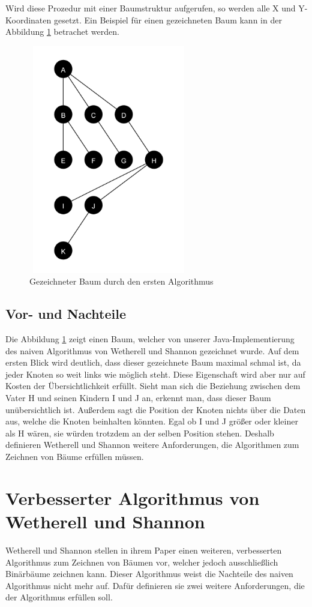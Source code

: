 Wird diese Prozedur mit einer Baumstruktur aufgerufen, so werden alle X und Y-Koordinaten gesetzt.
Ein Beispiel für einen gezeichneten Baum kann in der Abbildung \ref{pic:baum_algo_1} betrachet werden.

\begin{figure}
    \centering
    \includegraphics[width=7cm, height=10cm]{abbildungen/baum_algo_1}
    \caption{Gezeichneter Baum durch den ersten Algorithmus}
    \label{pic:baum_algo_1} 
\end{figure}

\subsection{Vor- und Nachteile}
Die Abbildung \ref{pic:baum_algo_1} zeigt einen Baum, welcher von unserer Java-Implementierung des naiven Algorithmus von Wetherell und Shannon
gezeichnet wurde.
Auf dem ersten Blick wird deutlich, dass dieser gezeichnete Baum maximal schmal ist, da jeder Knoten so weit links wie möglich steht.
Diese Eigenschaft wird aber nur auf Kosten der Übersichtlichkeit erfüllt. Sieht man sich die Beziehung zwischen dem Vater H und seinen Kindern
I und J an, erkennt man, dass dieser Baum unübersichtlich ist. Außerdem sagt die Position der Knoten nichts über die Daten aus, welche die Knoten
beinhalten könnten. Egal ob I und J größer oder kleiner als H wären, sie würden trotzdem an der selben Position stehen. Deshalb definieren
Wetherell und Shannon weitere Anforderungen, die Algorithmen zum Zeichnen von Bäume erfüllen müssen.

\section{Verbesserter Algorithmus von Wetherell und Shannon}
Wetherell und Shannon stellen in ihrem Paper einen weiteren, verbesserten Algorithmus zum Zeichnen von Bäumen vor, welcher jedoch
ausschließlich Binärbäume zeichnen kann. Dieser Algorithmus weist die Nachteile des naiven Algorithmus nicht mehr auf.
Dafür definieren sie zwei weitere Anforderungen, die der Algorithmus erfüllen soll.   

